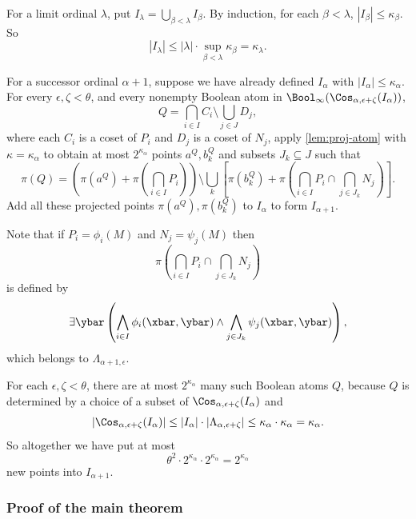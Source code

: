 \documentclass[11pt]{article}
\begin{document}
For a limit ordinal $\lambda$, put $I_\lambda = \bigcup_{\beta < \lambda} I_\beta$. By induction, for each $\beta < \lambda$, $|I_\beta| \leq \kappa_\beta$. So 
\[
    |I_\lambda| \leq |\lambda| \cdot \sup_{\beta < \lambda} \kappa_\beta = \kappa_\lambda.
\]

For a successor ordinal $\alpha+1$, suppose we have already defined $I_\alpha$ with $|I_\alpha| \leq \kappa_\alpha$. 
For every $\epsilon,\zeta < \theta$, and every nonempty Boolean atom in $\Bool_\infty(\Cos_{\alpha,\epsilon+\zeta}(I_\alpha))$,
\[
    Q = \bigcap_{i \in I} C_i \setminus \bigcup_{j \in J} D_j,
\]
where each $C_i$ is a coset of $P_i$ and $D_j$ is a coset of $N_j$, 
apply \cref{lem:proj-atom} with $\kappa = \kappa_\alpha$ to obtain at most $2^{\kappa_\alpha}$ points $a^{Q}, b_k^Q$ and subsets $J_k \subseteq J$ such that 
\[ 
    \pi(Q) = \left( \pi(a^Q) + \pi \! \left( \bigcap_{i \in I} P_i \right) \right) \setminus \bigcup_k \left[ \pi(b^Q_k) + \pi \left( \bigcap_{i \in I} P_i  \cap \bigcap_{j \in J_k} N_j \right) \right].
\]
Add all these projected points $\pi(a^Q),\pi(b_k^Q)$ to $I_\alpha$ to form $I_{\alpha+1}$. 

Note that if $P_i = \phi_i(M)$ and $N_j = \psi_j(M)$ then 
\[ \pi\! \left( \bigcap_{i \in I} P_i \cap \bigcap_{j \in J_k} N_j \right) \]
is defined by
\[ 
    \exists \ybar \left( \bigwedge_{i \in I} \phi_i(\xbar,\ybar) \wedge \bigwedge_{j \in J_k} \psi_j(\xbar,\ybar) \right),
\]
which belongs to $\Lambda_{\alpha+1,\epsilon}$.

For each $\epsilon,\zeta < \theta$, there are at most $2^{\kappa_\alpha}$ many such Boolean atoms $Q$, because $Q$ is determined by a choice of a subset of $\Cos_{\alpha,\epsilon+\zeta}(I_\alpha)$ and
\[ 
    |\Cos_{\alpha,\epsilon+\zeta}(I_\alpha)| \leq |I_\alpha| \cdot |\Lambda_{\alpha,\epsilon+\zeta}| \leq \kappa_\alpha \cdot \kappa_\alpha = \kappa_\alpha.
\]
So altogether we have put at most 
\[
    \theta^2 \cdot  2^{\kappa_\alpha} \cdot 2^{\kappa_\alpha} = 2^{\kappa_\alpha}
\]
new points into $I_{\alpha + 1}$.


\subsubsection{Proof of the main theorem}
\end{document}
